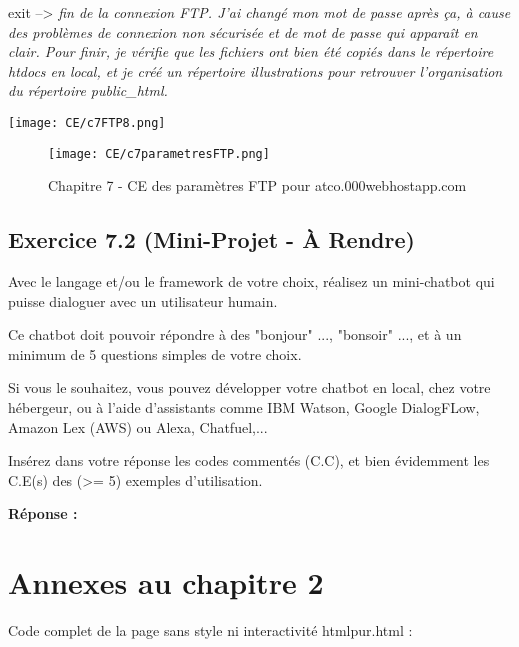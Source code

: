 \documentclass[11pt]{article}
\begin{document}
\begin{enumerate}
	{\sffamily exit} --> {\em fin de la connexion FTP. J’ai changé mon mot de passe après ça, à cause des problèmes de connexion non sécurisée et de mot de passe qui apparaît en clair. Pour finir, je vérifie que les fichiers ont bien été copiés dans le répertoire htdocs en local, et je créé un répertoire illustrations pour retrouver l’organisation du répertoire public\_html.}
							
		\texttt{[image: CE/c7FTP8.png]}

		\begin{figure}[h]
		\texttt{[image: CE/c7parametresFTP.png]}
		\caption{Chapitre 7 - CE des paramètres FTP pour atco.000webhostapp.com}
		\label{c7parametresFTP}
		\end{figure}
		

		
\end{enumerate}


	\subsection*{Exercice 7.2 (Mini-Projet - À Rendre)}
	
Avec le langage et/ou le framework de votre choix, réalisez un mini-chatbot qui puisse dialoguer avec un utilisateur humain.

Ce chatbot doit pouvoir répondre à des "bonjour" ..., "bonsoir" ..., et à un minimum de 5 questions simples de votre choix.

Si vous le souhaitez, vous pouvez développer votre chatbot en local, chez votre hébergeur, ou à l’aide d’assistants comme IBM
Watson, Google DialogFLow, Amazon Lex (AWS) ou Alexa, Chatfuel,...

Insérez dans votre réponse les codes commentés (C.C), et bien évidemment les C.E(s) des (>= 5) exemples d’utilisation.

\textbf{Réponse :}

\newpage

\appendix
\section{Annexes au chapitre 2}

Code complet de la page sans style ni interactivité htmlpur.html :

\smallskip
\end{document}
